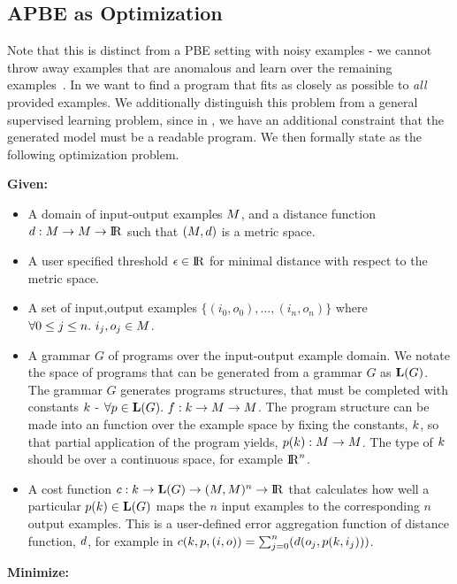 \subsection{APBE as Optimization}
Note that this is distinct from a PBE setting with noisy examples - we cannot throw away examples that are anomalous and learn over the remaining examples~\cite{raychev2016learning}.
In \approximatePBE we want to find a program that fits as closely as possible to \textit{all} provided examples.
We additionally distinguish this problem from a general supervised learning problem, since in \approximatePBE, we have an additional constraint that the generated model must be a readable program.
We then formally state \approximatePBE as the following optimization problem.

\noindent\textbf{Given:}
\begin{itemize}[topsep=0pt]
  \item A domain of input-output examples $M$, and a distance function $d:M \to M \to {\rm I\!R}$ such that $(M,{d})$ is a metric space.
  \item A user specified threshold $\epsilon \in {\rm I\!R}$ for minimal distance with respect to the metric space.
  \item A set of input,output examples $\{(i_0,o_0),...,(i_n,o_n)\}$ where $\forall 0 \leq j \leq n.\ i_j,o_j \in M$.
  \item A grammar $G$ of programs over the input-output example domain. 
        We notate the space of programs that can be generated from a grammar $G$ as $\mathbf{L}(G)$.
        The grammar $G$ generates programs structures, that must be completed with constants ${k}$ - $\forall p \in \mathbf{L}(G).\ f: {k} \to M \to M$. 
        The program structure can be made into an function over the example space by fixing the constants, ${k}$, so that partial application of the program yields, $p({k}): M \to M$. 
        The type of ${k}$ should be over a continuous space, for example ${\rm I\!R}^n$. 
  \item A cost function ${c} : {k} \to \mathbf{L}(G) \to (M,M)^n \to {\rm I\!R}$ that calculates how well a particular $p({k}) \in \mathbf{L}(G)$ maps the $n$ input examples to the corresponding $n$ output examples. This is a user-defined error aggregation function of distance function, ${d}$, for example in ${c}({k},p,(i,o)) = \sum_{j=0}^{n} ({d}(o_j,p({k},i_j)))$.
\end{itemize}
\textbf{Minimize:}

